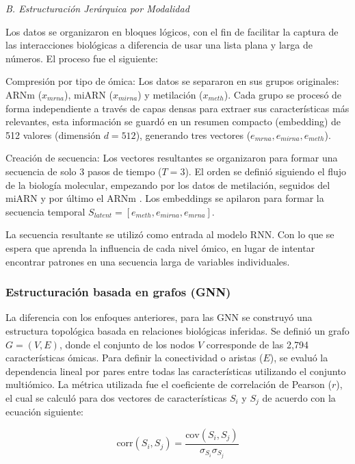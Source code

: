 \documentclass[review,12pt,times,number]{elsarticle}
\begin{document}
\textit{B. Estructuración Jerárquica por Modalidad}

Los datos se organizaron en bloques lógicos, con el fin de facilitar la captura de las interacciones biológicas a diferencia de usar una lista plana y larga de números. El proceso fue el siguiente:

Compresión por tipo de ómica: Los datos se separaron en sus grupos originales: ARNm ($x_{mrna}$), miARN ($x_{mirna}$) y metilación ($x_{meth}$). Cada grupo se procesó de forma independiente a través de capas densas para extraer sus características más relevantes, esta información se guardó en un resumen compacto (embedding) de 512 valores (dimensión $d=512$), generando tres vectores ($e_{mrna}, e_{mirna}, e_{meth}$).

Creación de secuencia: Los vectores resultantes se organizaron para formar una secuencia de solo 3 pasos de tiempo ($T=3$). El orden se definió siguiendo el flujo de la biología molecular, empezando por los datos de metilación, seguidos del miARN y por último el ARNm \cite{jeon2025investigating,fabbri2010epigenetics}. Los embeddings se apilaron para formar la secuencia temporal $S_{latent} = [e_{meth}, e_{mirna}, e_{mrna}]$.

La secuencia resultante se utilizó como entrada al modelo RNN. Con lo que se espera que aprenda la influencia de cada nivel ómico, en lugar de intentar encontrar patrones en una secuencia larga de variables individuales.

\subsubsection{Estructuración basada en grafos (GNN)}

La diferencia con los enfoques anteriores, para las GNN se construyó una estructura topológica basada en relaciones biológicas inferidas. Se definió un grafo $G = (V, E)$, donde el conjunto de los nodos $V$ corresponde de las 2,794 características ómicas. Para definir la conectividad o aristas ($E$), se evaluó la dependencia lineal por pares entre todas las características utilizando el conjunto multiómico. La métrica utilizada fue el coeficiente de correlación de Pearson ($r$), el cual se calculó para dos vectores de características $S_i$ y $S_j$ de acuerdo con la ecuación siguiente:

\begin{equation}
    \text{corr}(S_i, S_j) = \frac{\text{cov}(S_i, S_j)}{\sigma_{S_i} \sigma_{S_j}}
\end{equation}
\end{document}
